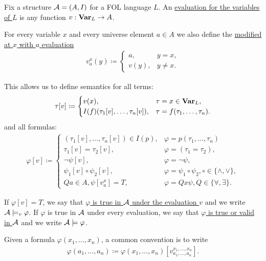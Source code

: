 \begin{definition}\label{def:first_order_variable_evaluation}
  Fix a structure $\mathcal A = (A, I)$ for a FOL language $L$. An \uline{evaluation for the variables of $L$} is any function $v: \operatorname{\mathbf{Var}}_L \to A$.

  For every variable $x$ and every universe element $a \in A$ we also define the \uline{modified at $x$ with $a$ evaluation}
  \begin{align*}
    v_a^x(y) \coloneqq \begin{cases}
      a,    &y = x, \\
      v(y), &y \neq x.
    \end{cases}
  \end{align*}

  This allows us to define semantics for all terms:
  \begin{align*}
    \tau[v] \coloneqq \begin{cases}
      v(x),                               &\tau = x \in \operatorname{\mathbf{Var}}_L, \\
      I(f)(\tau_1[v], \ldots, \tau_n[v]), &\tau = f(\tau_1, \ldots, \tau_n).
    \end{cases}
  \end{align*}
  and all formulas:
  \begin{align*}
    \varphi[v] \coloneqq \begin{cases}
      (\tau_1[v], \ldots, \tau_n[v]) \in I(p), &\varphi = p(\tau_1, \ldots, \tau_n) \\
      \tau_1[v] = \tau_2[v],                   &\varphi = (\tau_1 = \tau_2), \\
      \neg \psi[v],                            &\varphi = \neg \psi, \\
      \psi_1[v] \circ \psi_2[v],               &\varphi = \psi_1 \circ \psi_2, \circ \in \{ \land, \lor \}, \\
      Q a \in A, \psi[v_a^x] = T,              &\varphi = Q x \psi, Q \in \{ \forall, \exists \}.
    \end{cases}
  \end{align*}

  If $\varphi[v] = T$, we say that \uline{$\varphi$ is true in $\mathcal A$ under the evaluation $v$} and we write $\mathcal A \models_v \varphi$. If $\varphi$ is true in $\mathcal A$ under every evaluation, we say that \uline{$\varphi$ is true or valid in $\mathcal A$} and we write $\mathcal A \models \varphi$.

  Given a formula $\varphi(x_1, \ldots, x_n)$, a common convention is to write
  \begin{align*}
    \varphi(a_1, \ldots, a_n) \coloneqq \varphi(x_1, \ldots, x_n)[v_{a_1, \ldots, a_n}^{x_1, \ldots, x_n}].
  \end{align*}
\end{definition}

